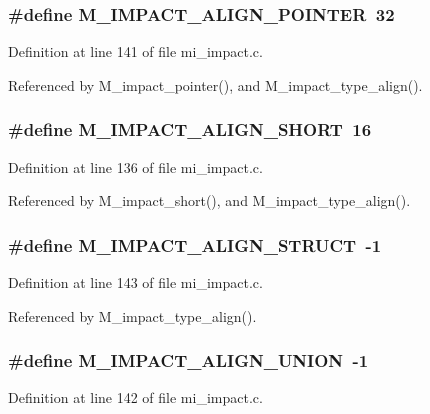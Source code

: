 \subsubsection{\setlength{\rightskip}{0pt plus 5cm}\#define M\_\-IMPACT\_\-ALIGN\_\-POINTER~32}\label{mi__impact_8c_dca3c02cd429101391dd6ee6347d407b}




Definition at line 141 of file mi\_\-impact.c.

Referenced by M\_\-impact\_\-pointer(), and M\_\-impact\_\-type\_\-align().
\subsubsection{\setlength{\rightskip}{0pt plus 5cm}\#define M\_\-IMPACT\_\-ALIGN\_\-SHORT~16}\label{mi__impact_8c_1498e03bd549907d1c9b135969fc51b4}




Definition at line 136 of file mi\_\-impact.c.

Referenced by M\_\-impact\_\-short(), and M\_\-impact\_\-type\_\-align().
\subsubsection{\setlength{\rightskip}{0pt plus 5cm}\#define M\_\-IMPACT\_\-ALIGN\_\-STRUCT~-1}\label{mi__impact_8c_d85278b5ca39a38b04992b24c30f60f8}




Definition at line 143 of file mi\_\-impact.c.

Referenced by M\_\-impact\_\-type\_\-align().
\subsubsection{\setlength{\rightskip}{0pt plus 5cm}\#define M\_\-IMPACT\_\-ALIGN\_\-UNION~-1}\label{mi__impact_8c_c9f22d73b371355310c4348d88bd0e8e}




Definition at line 142 of file mi\_\-impact.c.

